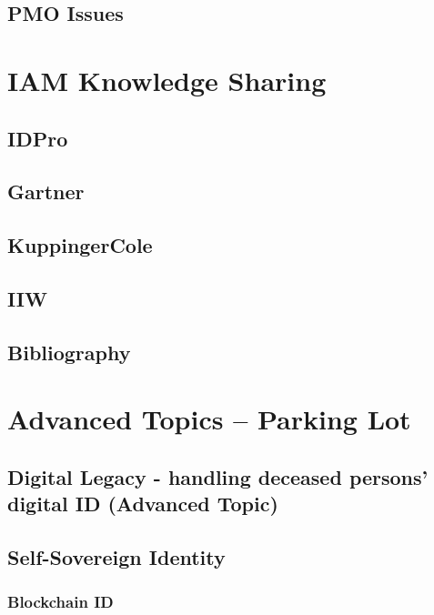 \hypertarget{pmo-issues}{%
\section{PMO Issues}\label{pmo-issues}}

\hypertarget{iam-knowledge-sharing}{%
\chapter{IAM Knowledge Sharing}\label{iam-knowledge-sharing}}

\hypertarget{idpro}{%
\section{IDPro}\label{idpro}}

\hypertarget{gartner}{%
\section{Gartner}\label{gartner}}

\hypertarget{kuppingercole}{%
\section{KuppingerCole}\label{kuppingercole}}

\hypertarget{iiw}{%
\section{IIW}\label{iiw}}

\hypertarget{bibliography}{%
\section{Bibliography}\label{bibliography}}

\hypertarget{section}{%
\section{}\label{section}}

\hypertarget{advanced-topics-parking-lot}{%
\chapter{Advanced Topics -- Parking
Lot}\label{advanced-topics-parking-lot}}

\hypertarget{digital-legacy---handling-deceased-persons-digital-id-advanced-topic}{%
\section{Digital Legacy - handling deceased persons' digital ID
(Advanced
Topic)}\label{digital-legacy---handling-deceased-persons-digital-id-advanced-topic}}

\hypertarget{self-sovereign-identity}{%
\section{Self-Sovereign Identity}\label{self-sovereign-identity}}

\hypertarget{blockchain-id}{%
\subsection{Blockchain ID}\label{blockchain-id}}
